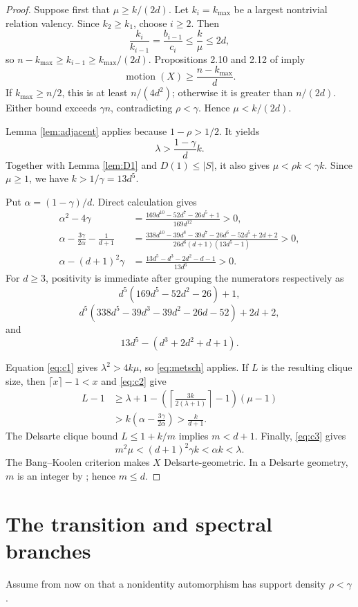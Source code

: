 \documentclass[11pt]{amsart}
\theoremstyle{definition}
\newcommand{\mot}{\operatorname{motion}}
\newcommand{\gam}{\gamma}
\begin{document}
\begin{proof}
Suppose first that $\mu\ge k/(2d)$.  Let $k_i=k_{\max}$ be a largest nontrivial relation valency.  Since $k_2\ge k_1$, choose $i\ge2$.  Then
\[
 \frac{k_i}{k_{i-1}}=\frac{b_{i-1}}{c_i}\le\frac{k}{\mu}\le2d,
\]
so $n-k_{\max}\ge k_{i-1}\ge k_{\max}/(2d)$.  Propositions 2.10 and 2.12 of \cite{PS} imply
\[
 \mot(X)\ge\frac{n-k_{\max}}d.
\]
If $k_{\max}\ge n/2$, this is at least $n/(4d^2)$; otherwise it is greater than $n/(2d)$.  Either bound exceeds $\gam n$, contradicting $\rho<\gam$.  Hence $\mu<k/(2d)$.

Lemma \ref{lem:adjacent} applies because $1-\rho>1/2$.  It yields
\[
 \lambda>\frac{1-\gam}{d}k.
\]
Together with Lemma \ref{lem:D1} and $D(1)\le|S|$, it also gives
$\mu<\rho k<\gam k$.  Since $\mu\ge1$, we have $k>1/\gam=13d^5$.

Put $\alpha=(1-\gam)/d$.  Direct calculation gives
\begin{align}
 \alpha^2-4\gam
 &=\frac{169d^{10}-52d^7-26d^5+1}{169d^{12}}>0,\label{eq:c1}\\
 \alpha-\frac{3\gam}{2\alpha}-\frac1{d+1}
 &=\frac{338d^{10}-39d^8-39d^7-26d^6-52d^5+2d+2}
 {26d^6(d+1)(13d^5-1)}>0,\label{eq:c2}\\
 \alpha-(d+1)^2\gam
 &=\frac{13d^5-d^3-2d^2-d-1}{13d^6}>0.\label{eq:c3}
\end{align}
For $d\ge3$, positivity is immediate after grouping the numerators respectively as
\[
 d^5(169d^5-52d^2-26)+1,
\]
\[
 d^5(338d^5-39d^3-39d^2-26d-52)+2d+2,
\]
and
\[
 13d^5-(d^3+2d^2+d+1).
\]

Equation \eqref{eq:c1} gives $\lambda^2>4k\mu$, so \eqref{eq:metsch} applies.  If $L$ is the resulting clique size, then $\lceil x\rceil-1<x$ and \eqref{eq:c2} give
\begin{align*}
 L-1
 &\ge \lambda+1-
 \left(\left\lceil\frac{3k}{2(\lambda+1)}\right\rceil-1\right)(\mu-1)\\
 &>k\left(\alpha-\frac{3\gam}{2\alpha}\right)
 >\frac{k}{d+1}.
\end{align*}
The Delsarte clique bound $L\le1+k/m$ implies $m<d+1$.  Finally, \eqref{eq:c3} gives
\[
 m^2\mu<(d+1)^2\gam k<\alpha k<\lambda.
\]
The Bang--Koolen criterion \cite[Proposition 2.5]{PS} makes $X$ Delsarte-geometric.  In a Delsarte geometry, $m$ is an integer by \cite[Lemma 2.3]{PS}; hence $m\le d$.
\end{proof}

\section{The transition and spectral branches}
Assume from now on that a nonidentity automorphism has support density $\rho<\gam$.
\end{document}
